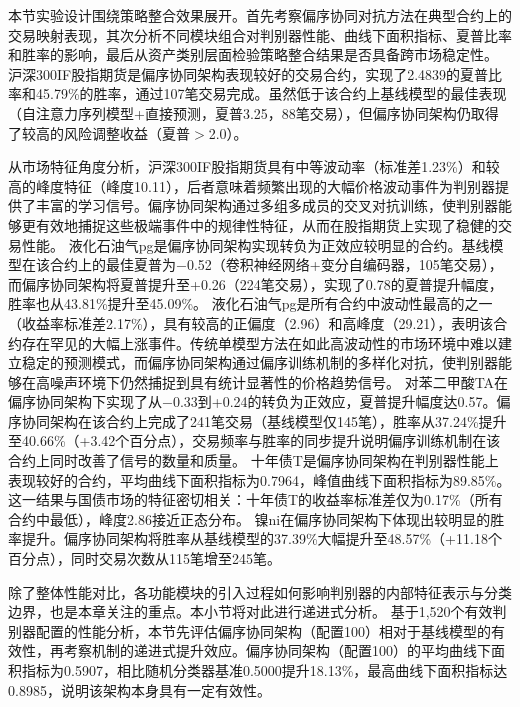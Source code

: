 本节实验设计围绕策略整合效果展开。首先考察偏序协同对抗方法在典型合约上的交易映射表现，其次分析不同模块组合对判别器性能、曲线下面积指标、夏普比率和胜率的影响，最后从资产类别层面检验策略整合结果是否具备跨市场稳定性。
沪深300IF股指期货是偏序协同架构表现较好的交易合约，实现了2.4839的夏普比率和45.79\%的胜率，通过107笔交易完成。虽然低于该合约上基线模型的最佳表现（自注意力序列模型+直接预测，夏普3.25，88笔交易），但偏序协同架构仍取得了较高的风险调整收益（夏普$>$2.0）。

从市场特征角度分析，沪深300IF股指期货具有中等波动率（标准差1.23\%）和较高的峰度特征（峰度10.11），后者意味着频繁出现的大幅价格波动事件为判别器提供了丰富的学习信号。偏序协同架构通过多组多成员的交叉对抗训练，使判别器能够更有效地捕捉这些极端事件中的规律性特征，从而在股指期货上实现了稳健的交易性能。
液化石油气pg是偏序协同架构实现转负为正效应较明显的合约。基线模型在该合约上的最佳夏普为$-$0.52（卷积神经网络+变分自编码器，105笔交易），而偏序协同架构将夏普提升至+0.26（224笔交易），实现了0.78的夏普提升幅度，胜率也从43.81\%提升至45.09\%。
液化石油气pg是所有合约中波动性最高的之一（收益率标准差2.17\%），具有较高的正偏度（2.96）和高峰度（29.21），表明该合约存在罕见的大幅上涨事件。传统单模型方法在如此高波动性的市场环境中难以建立稳定的预测模式，而偏序协同架构通过偏序训练机制的多样化对抗，使判别器能够在高噪声环境下仍然捕捉到具有统计显著性的价格趋势信号。
对苯二甲酸TA在偏序协同架构下实现了从$-$0.33到+0.24的转负为正效应，夏普提升幅度达0.57。偏序协同架构在该合约上完成了241笔交易（基线模型仅145笔），胜率从37.24\%提升至40.66\%（+3.42个百分点），交易频率与胜率的同步提升说明偏序训练机制在该合约上同时改善了信号的数量和质量。
十年债T是偏序协同架构在判别器性能上表现较好的合约，平均曲线下面积指标为0.7964，峰值曲线下面积指标为89.85\%。这一结果与国债市场的特征密切相关：十年债T的收益率标准差仅为0.17\%（所有合约中最低），峰度2.86接近正态分布。
镍ni在偏序协同架构下体现出较明显的胜率提升。偏序协同架构将胜率从基线模型的37.39\%大幅提升至48.57\%（+11.18个百分点），同时交易次数从115笔增至245笔。

除了整体性能对比，各功能模块的引入过程如何影响判别器的内部特征表示与分类边界，也是本章关注的重点。本小节将对此进行递进式分析。
基于1,520个有效判别器配置的性能分析，本节先评估偏序协同架构（配置100）相对于基线模型的有效性，再考察机制的递进式提升效应。偏序协同架构（配置100）的平均曲线下面积指标为0.5907，相比随机分类器基准0.5000提升18.13\%，最高曲线下面积指标达0.8985，说明该架构本身具有一定有效性。

